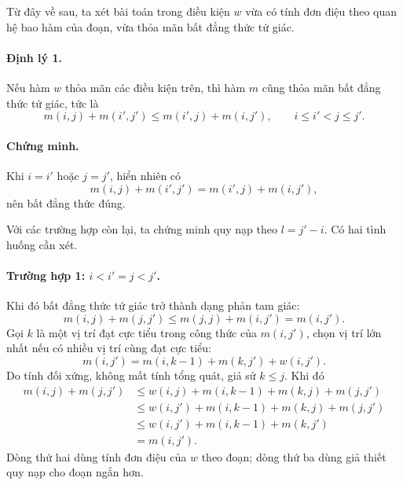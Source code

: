 \documentclass[11pt]{article}
\begin{document}
Từ đây về sau, ta xét bài toán trong điều kiện $w$ vừa có tính đơn điệu theo
quan hệ bao hàm của đoạn, vừa thỏa mãn bất đẳng thức tứ giác.

\paragraph{Định lý 1.}
Nếu hàm $w$ thỏa mãn các điều kiện trên, thì hàm $m$ cũng thỏa mãn bất đẳng
thức tứ giác, tức là
\[
  m(i,j)+m(i',j')\le m(i',j)+m(i,j'),
  \qquad i\le i'<j\le j'.
\]

\paragraph{Chứng minh.}
Khi $i=i'$ hoặc $j=j'$, hiển nhiên có
\[
  m(i,j)+m(i',j')=m(i',j)+m(i,j'),
\]
nên bất đẳng thức đúng.

Với các trường hợp còn lại, ta chứng minh quy nạp theo
$l=j'-i$. Có hai tình huống cần xét.

\paragraph{Trường hợp 1: $i<i'=j<j'$.}
Khi đó bất đẳng thức tứ giác trở thành dạng phản tam giác:
\[
  m(i,j)+m(j,j')\le m(j,j)+m(i,j')=m(i,j').
\]
Gọi $k$ là một vị trí đạt cực tiểu trong công thức của $m(i,j')$, chọn vị trí
lớn nhất nếu có nhiều vị trí cùng đạt cực tiểu:
\[
  m(i,j')=m(i,k-1)+m(k,j')+w(i,j').
\]
Do tính đối xứng, không mất tính tổng quát, giả sử $k\le j$. Khi đó
\[
\begin{aligned}
  m(i,j)+m(j,j')
  &\le w(i,j)+m(i,k-1)+m(k,j)+m(j,j') \\
  &\le w(i,j')+m(i,k-1)+m(k,j)+m(j,j') \\
  &\le w(i,j')+m(i,k-1)+m(k,j') \\
  &=m(i,j').
\end{aligned}
\]
Dòng thứ hai dùng tính đơn điệu của $w$ theo đoạn; dòng thứ ba dùng giả thiết
quy nạp cho đoạn ngắn hơn.
\end{document}
